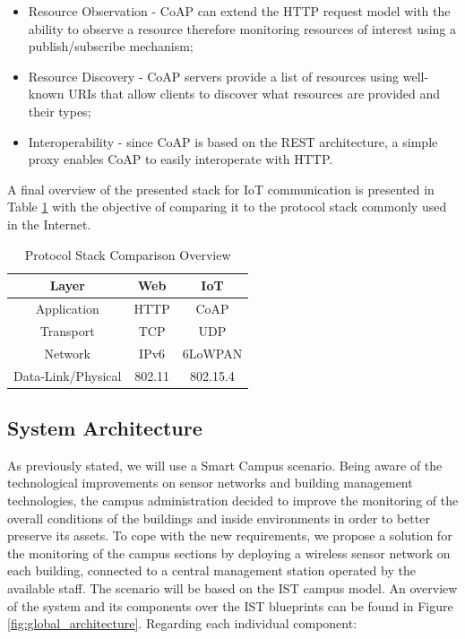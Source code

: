 \documentclass{sig-alternate-05-2015}
\begin{document}
\begin{itemize}
	\item Resource Observation - \gls{CoAP} can extend the \gls{HTTP} request model with the ability to observe a resource therefore monitoring resources of interest using a publish/subscribe mechanism;
	\item Resource Discovery - \gls{CoAP} servers provide a list of resources using well-known {URIs} that allow clients to discover what resources are provided and their types;
	\item Interoperability - since \gls{CoAP} is based on the \gls{REST} architecture, a simple proxy enables \gls{CoAP} to easily interoperate with \gls{HTTP}.
\end{itemize}

A final overview of the presented stack for \gls{IoT} communication is presented in Table \ref{tab:stack} with the objective of comparing it to the protocol stack commonly used in the Internet.

\begin{table}[h]
	\centering
	\begin{center} \caption{Protocol Stack Comparison Overview } \label{tab:stack}\end{center}
	\begin{tabular}{c|c|c}
		Layer & Web & IoT \\
		\hline
		Application & \gls{HTTP} & \gls{CoAP} \\
		Transport & \gls{TCP} & \gls{UDP} \\
		Network & IPv6 & 6LoWPAN \\
		Data-Link/Physical & 802.11 & 802.15.4
	\end{tabular}
\end{table}

\subsection{System Architecture}
\label{sec:system_architecture}
As previously stated, we will use a Smart Campus scenario. Being aware of the technological improvements on sensor networks and building management technologies, the campus administration decided to improve the monitoring of the overall conditions of the buildings and inside environments in order to better preserve its assets. To cope with the new requirements, we propose a solution for the monitoring of the campus sections by deploying a wireless sensor network on each building, connected to a central management station operated by the available staff. The scenario will be based on the \gls{IST} campus model. An overview of the system and its components over the \gls{IST} blueprints can be found in Figure \ref{fig:global_architecture}. Regarding each individual component:
\end{document}
